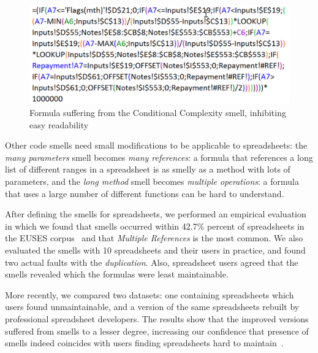 \documentclass[conference]{IEEEtran}
\begin{document}
\begin{figure}
  \begin{center}
  \includegraphics[width=\columnwidth]{fig/ConditionalComplexity.png}
  \caption{Formula suffering from the Conditional Complexity smell, inhibiting easy readability}
  \label{fig:ConditionalComplexity}
  \end{center}
\end{figure} 

Other code smells need small modifications to be applicable to spreadsheets: the \emph{many parameters} smell becomes \emph{many references}: a formula that references a long list of different ranges in a spreadsheet is as smelly as a method with lots of parameters, and the \emph{long method} smell becomes \emph{multiple operations}: a formula that uses a large number of different functions can be hard to understand. 

After defining the smells for spreadsheets, we performed an empirical evaluation in which we found that smells occurred within 42.7\% percent of spreadsheets in the EUSES corpus~\cite{fisher_euses_2005} and that \emph{Multiple References} is the most common. We also evaluated the smells with 10 spreadsheets and their users in practice, and found two actual faults with the \emph{duplication}. Also, spreadsheet users agreed that the
smells revealed which the formulas were least maintainable.

More recently, we compared two datasets: one containing spreadsheets which users found unmaintainable, and a version of the same spreadsheets rebuilt by professional spreadsheet developers. The results show that the improved versions suffered from smells to a lesser degree, increasing our confidence that presence of smells indeed coincides with users finding spreadsheets hard to maintain~\cite{Jansen2015}.

\end{document}
